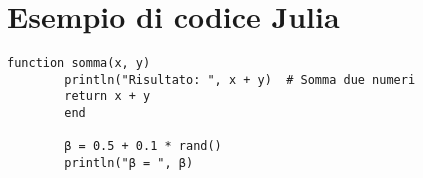 \documentclass{article}
\begin{document}
	
	\section*{Esempio di codice Julia}
	\begin{lstlisting}[style=juliaCustom]
		function somma(x, y)
		println("Risultato: ", x + y)  # Somma due numeri
		return x + y
		end
		
		β = 0.5 + 0.1 * rand()
		println("β = ", β)
	\end{lstlisting}
	
	
	
	
\end{document}
